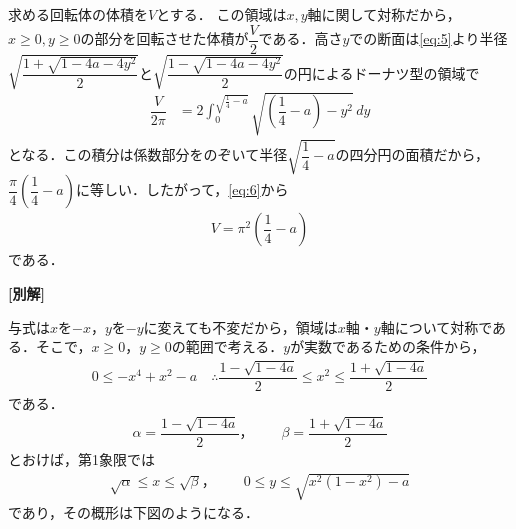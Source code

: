\documentclass[../../main.tex]{subfiles}
\begin{document}
求める回転体の体積を$V$とする．
この領域は$x,y$軸に関して対称だから，$x\ge 0, y\ge 0$の部分を回転させた体積が$\dfrac{V}{2}$である．高さ$y$での断面は\cref{eq:5}より半径$\sqrt{\dfrac{1+\sqrt{1-4a-4y^2}}{2}}$と$\sqrt{\dfrac{1-\sqrt{1-4a-4y^2}}{2}}$の円によるドーナツ型の領域で
\begin{align}
  \dfrac{V}{2\pi}
  &=2\int_0^{\sqrt{\frac{1}{4}-a}}\sqrt{\left(\dfrac{1}{4}-a\right)-y^2}\,dy
  \label{eq:6}
\end{align}
となる．この積分は係数部分をのぞいて半径$\sqrt{\dfrac{1}{4}-a}$の四分円の面積だから，$\dfrac{\pi}{4}\left(\dfrac{1}{4}-a\right)$に等しい．したがって，\cref{eq:6}から
\begin{align}
  V=\pi^2\left(\dfrac{1}{4}-a\right)
\end{align}
である．

{\bf [別解]}

与式は$x$を$-x$，$y$を$-y$に変えても不変だから，領域は$x$軸・$y$軸について対称である．そこで，$x\ge0$，$y\ge0$の範囲で考える．$y$が実数であるための条件から，
\begin{align}
  0\le-x^4+x^2-a
  \quad \therefore
  \dfrac{1-\sqrt{1-4a}}{2}\le x^2\le\dfrac{1+\sqrt{1-4a}}{2}
\end{align}
である．
\begin{align}
  \alpha=\dfrac{1-\sqrt{1-4a}}{2}，\qquad
  \beta=\dfrac{1+\sqrt{1-4a}}{2}
\end{align}
とおけば，第1象限では
\begin{align}
  \sqrt{\alpha}\le x\le\sqrt{\beta}，\qquad
  0\le y\le\sqrt{x^2(1-x^2)-a}
\end{align}
であり，その概形は下図のようになる．
\end{document}
